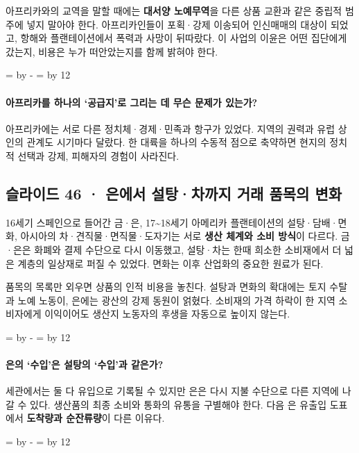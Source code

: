 \documentclass[10pt,a4paper]{article}
\newcommand{\ReserveQuestionSpace}{%
  \par\begingroup
  \dimen0=\pagegoal \advance\dimen0 by -\pagetotal
  \dimen2=\baselineskip \multiply\dimen2 by 12
  \ifdim\dimen0<\dimen2 \newpage\fi
  \endgroup}
\begin{document}
아프리카와의 교역을 말할 때에는 \textbf{대서양 노예무역}을 다른 상품 교환과 같은 중립적 범주에 넣지 말아야 한다. 아프리카인들이 포획·강제 이송되어 인신매매의 대상이 되었고, 항해와 플랜테이션에서 폭력과 사망이 뒤따랐다. 이 사업의 이윤은 어떤 집단에게 갔는지, 비용은 누가 떠안았는지를 함께 밝혀야 한다.\par

\ReserveQuestionSpace
\paragraph{아프리카를 하나의 ‘공급지’로 그리는 데 무슨 문제가 있는가?}
아프리카에는 서로 다른 정치체·경제·민족과 항구가 있었다. 지역의 권력과 유럽 상인의 관계도 시기마다 달랐다. 한 대륙을 하나의 수동적 점으로 축약하면 현지의 정치적 선택과 강제, 피해자의 경험이 사라진다.\par

\subsection{슬라이드 46 · 은에서 설탕·차까지 거래 품목의 변화}
16세기 스페인으로 들어간 금·은, 17\textasciitilde{}18세기 아메리카 플랜테이션의 설탕·담배·면화, 아시아의 차·견직물·면직물·도자기는 서로 \textbf{생산 체계와 소비 방식}이 다르다. 금·은은 화폐와 결제 수단으로 다시 이동했고, 설탕·차는 한때 희소한 소비재에서 더 넓은 계층의 일상재로 퍼질 수 있었다. 면화는 이후 산업화의 중요한 원료가 된다.\par

품목의 목록만 외우면 상품의 인적 비용을 놓친다. 설탕과 면화의 확대에는 토지 수탈과 노예 노동이, 은에는 광산의 강제 동원이 얽혔다. 소비재의 가격 하락이 한 지역 소비자에게 이익이어도 생산지 노동자의 후생을 자동으로 높이지 않는다.\par

\ReserveQuestionSpace
\paragraph{은의 ‘수입’은 설탕의 ‘수입’과 같은가?}
세관에서는 둘 다 유입으로 기록될 수 있지만 은은 다시 지불 수단으로 다른 지역에 나갈 수 있다. 생산품의 최종 소비와 통화의 유통을 구별해야 한다. 다음 은 유출입 도표에서 \textbf{도착량과 순잔류량}이 다른 이유다.\par

\ReserveQuestionSpace
\end{document}
